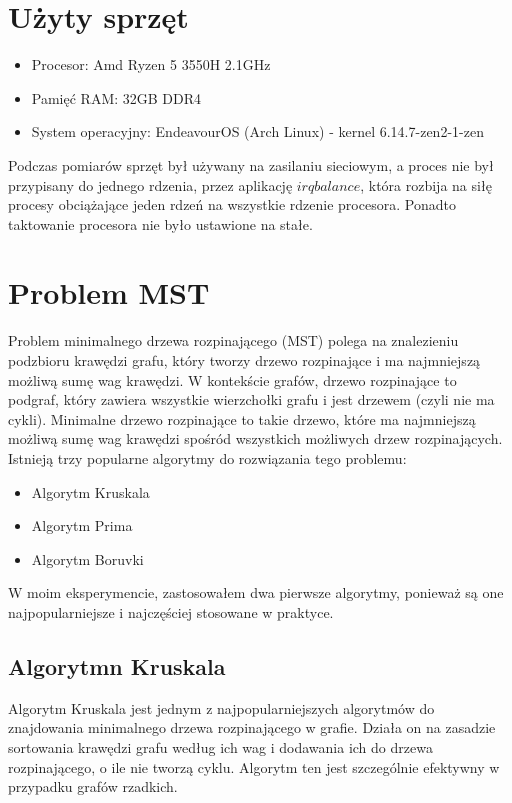 \documentclass{article}
\begin{document}
\section{Użyty sprzęt}

\begin{itemize}
    \item Procesor: Amd Ryzen 5 3550H 2.1GHz
    \item Pamięć RAM: 32GB DDR4
    \item System operacyjny: EndeavourOS (Arch Linux) - kernel 6.14.7-zen2-1-zen
\end{itemize}

Podczas pomiarów sprzęt był używany na zasilaniu sieciowym, a proces nie był przypisany do jednego rdzenia, przez aplikację $irqbalance$, która rozbija na siłę procesy
obciążające jeden rdzeń na wszystkie rdzenie procesora. Ponadto taktowanie procesora nie było ustawione na stałe.

\section{Problem MST}

Problem minimalnego drzewa rozpinającego (MST) polega na znalezieniu podzbioru krawędzi grafu, który tworzy drzewo rozpinające i ma najmniejszą możliwą sumę wag krawędzi.
W kontekście grafów, drzewo rozpinające to podgraf, który zawiera wszystkie wierzchołki grafu i jest drzewem (czyli nie ma cykli). Minimalne drzewo rozpinające to takie drzewo, które ma najmniejszą możliwą sumę wag krawędzi spośród wszystkich możliwych drzew rozpinających.
Istnieją trzy popularne algorytmy do rozwiązania tego problemu:
\begin{itemize}
    \item Algorytm Kruskala
    \item Algorytm Prima
    \item Algorytm Boruvki
\end{itemize}

W moim eksperymencie, zastosowałem dwa pierwsze algorytmy, ponieważ są one najpopularniejsze i najczęściej stosowane w praktyce.

\subsection{Algorytmn Kruskala}

Algorytm Kruskala jest jednym z najpopularniejszych algorytmów do znajdowania minimalnego drzewa rozpinającego w grafie.
Działa on na zasadzie sortowania krawędzi grafu według ich wag i dodawania ich do drzewa rozpinającego, o ile nie tworzą cyklu. 
Algorytm ten jest szczególnie efektywny w przypadku grafów rzadkich.
\end{document}
